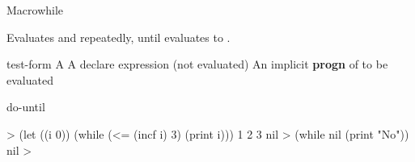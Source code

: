 \documentclass[10pt,twoside,english,pdftex]{article}
\begin{document}

\begin{functiondoc}{Macro}{while}{ 
    \superstar{}
    \superstar}
%
  
\fnsyntax

\fnpurpose Evaluates  and  repeatedly,
until  evaluates to \nil.

\fnpackage {}

\fnmodule {}

\fnargs
\begin{args}{test-form}
 A 
\arg[declaration] A declare expression (not evaluated)
\arg[forms] An implicit \textbf{progn} of  to be evaluated
\end{args}

\begin{alsos}{do-until}
\also[do-until]
\also[until]
\end{alsos}

\fnexamples
%
\W\supp
\begin{example}
  > (let ((i 0)) 
      (while (<= (incf i) 3) 
         (print i)))
  1 
  2 
  3 
  nil\goodpagebreak
  > (while nil (print "No"))
  nil
  >
\end{example}

\end{functiondoc}

\end{document}
